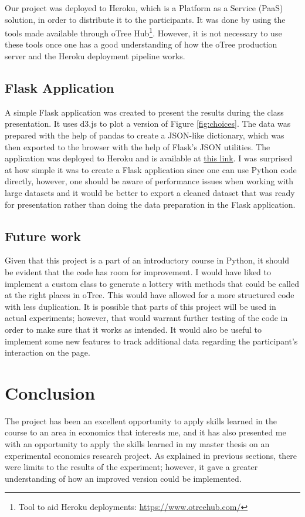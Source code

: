 \documentclass [12pt,a4paper,oneside]{article}
\begin{document}
Our project was deployed to Heroku, which is a Platform as a Service (PaaS) solution, in order to distribute it to the participants. It was done by using the tools made available through oTree Hub\footnote{Tool to aid Heroku deployments: \url{https://www.otreehub.com/}}. However, it is not necessary to use these tools once one has a good understanding of how the oTree production server and the Heroku deployment pipeline works. 

\subsection{Flask Application}
A simple Flask application was created to present the results during the class presentation. It uses d3.js to plot a version of Figure \ref{fig:choices}. The data was prepared with the help of pandas to create a JSON-like dictionary, which was then exported to the browser with the help of Flask's JSON utilities. The application was deployed to Heroku and is available at \href{https://progtech-flask-app.herokuapp.com/}{this link}. I was surprised at how simple it was to create a Flask application since one can use Python code directly, however, one should be aware of performance issues when working with large datasets and it would be better to export a cleaned dataset that was ready for presentation rather than doing the data preparation in the Flask application. 

\subsection{Future work}
Given that this project is a part of an introductory course in Python, it should be evident that the code has room for improvement. I would have liked to implement a custom class to generate a lottery with methods that could be called at the right places in oTree. This would have allowed for a more structured code with less duplication. It is possible that parts of this project will be used in actual experiments; however, that would warrant further testing of the code in order to make sure that it works as intended. It would also be useful to implement some new features to track additional data regarding the participant's interaction on the page. 


\newpage 
\section{Conclusion}
The project has been an excellent opportunity to apply skills learned in the course to an area in economics that interests me, and it has also presented me with an opportunity to apply the skills learned in my master thesis on an experimental economics research project. As explained in previous sections, there were limits to the results of the experiment; however, it gave a greater understanding of how an improved version could be implemented.



\newpage
\printbibliography
\end{document}
